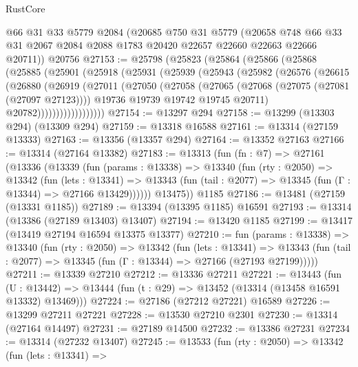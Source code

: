 \begin{lexlean}{RustCore}
\begin{coremodule}
    @66
    @31
    @33
    @5779
    @2084
    (@20685
      @750
      @31
      @5779
      (@20658 @748 @66 @33 @31 @2067 @2084 @2088 @1783 @20420 @22657 @22660 @22663 @22666 @20711))
    @20756
@27153 := @25798
    (@25823
      (@25864
        (@25866
          (@25868
            (@25885
              (@25901
                (@25918
                  (@25931
                    (@25939
                      (@25943
                        (@25982
                          (@26576
                            (@26615
                              (@26880
                                (@26919
                                  (@27011
                                    (@27050
                                      (@27058
                                        (@27065
                                          (@27068 (@27075 (@27081 (@27097 @27123))))
                                          @19736
                                          @19739
                                          @19742
                                          @19745
                                          @20711)
                                        @20782))))))))))))))))))
@27154 := @13297 @294
@27158 := @13299 (@13303 @294) (@13309 @294)
@27159 := @13318 @16588
@27161 := @13314 (@27159 @13333)
@27163 := @13356 (@13357 @294)
@27164 := @13352 @27163
@27166 := @13314 (@27164 @13382)
@27183 := @13313
    (fun (fn : @7) =>
    @27161
      (@13336
        (@13339
          (fun (params : @13338) =>
          @13340
            (fun (rty : @2050) =>
            @13342
              (fun (lets : @13341) =>
              @13343 (fun (tail : @2077) => @13345 (fun (Γ : @13344) => @27166 @13429))))))
        @13475))
    @1185
@27186 := @13481 (@27159 (@13331 @1185))
@27189 := @13394 (@13395 @1185) @16591
@27193 := @13314 (@13386 (@27189 @13403) @13407)
@27194 := @13420 @1185
@27199 := @13417 (@13419 @27194 @16594 @13375 @13377)
@27210 := fun (params : @13338) =>
  @13340
    (fun (rty : @2050) =>
    @13342
      (fun (lets : @13341) =>
      @13343 (fun (tail : @2077) => @13345 (fun (Γ : @13344) => @27166 (@27193 @27199)))))
@27211 := @13339 @27210
@27212 := @13336 @27211
@27221 := @13443
    (fun (U : @13442) => @13444 (fun (t : @29) => @13452 (@13314 (@13458 @16591 @13332) @13469)))
@27224 := @27186 (@27212 @27221) @16589
@27226 := @13299 @27211 @27221
@27228 := @13530 @27210 @2301
@27230 := @13314 (@27164 @14497)
@27231 := @27189 @14500
@27232 := @13386 @27231
@27234 := @13314 (@27232 @13407)
@27245 := @13533
    (fun (rty : @2050) =>
    @13342
      (fun (lets : @13341) =>

\end{coremodule}
\end{lexlean}
